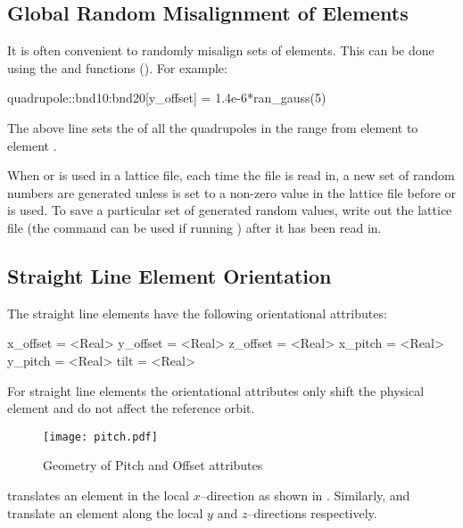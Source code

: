 \subsection{Global Random Misalignment of Elements}
\label{s:global.mis}

It is often convenient to randomly misalign sets of elements. This can be done using the 
and  functions (). For example:
\begin{example}
  quadrupole::bnd10:bnd20[y_offset] = 1.4e-6*ran_gauss(5)
\end{example}
The above line sets the  of all the quadrupoles in the range from element  to
element . 

When  or  is used in a lattice file, each time the file is read in, a new set
of random numbers are generated unless  is set to a non-zero value in the
lattice file before  or  is used. To save a particular set of generated 
random values, write out the lattice file (the  command can be used if running \tao)
after it has been read in.

\subsection{Straight Line Element Orientation}
\label{s:straight.orient}

The straight line elements have the following orientational attributes:
\begin{example}
  x_offset = <Real>
  y_offset = <Real>
  z_offset = <Real>
  x_pitch  = <Real>
  y_pitch  = <Real>
  tilt     = <Real>    
\end{example}
For straight line elements the orientational attributes only shift the
physical element and do not affect the reference orbit.

\begin{figure}[tb]
  \centering
  \texttt{[image: pitch.pdf]}
  \caption{Geometry of Pitch and Offset attributes}
  \label{f:pitch}
\end{figure}

 translates an element in the local $x$--direction as shown in
. Similarly,  and  translate an element along the local $y$
and $z$--directions respectively.

